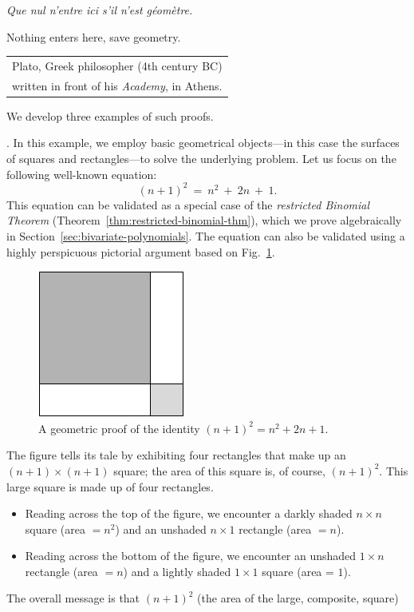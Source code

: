 \medskip


{\it Que nul n'entre ici s'il n'est g\'eom\`etre.}

Nothing enters here, save geometry.

\hfill {\small \begin{tabular}{l}
Plato, Greek philosopher (4th century BC) \\
written in front of his \textit{Academy}, in Athens. 
\end{tabular} }

\medskip

\noindent
We develop three examples of such proofs.

\medskip

.
In this example, we employ basic geometrical objects---in this case the surfaces of squares and rectangles---to solve the underlying problem.  Let us focus on the following well-known equation:
\begin{equation}
(n+1)^2 \ = \ n^2 \ + \ 2n \ + \ 1.
\end{equation}
This equation can be validated as a special case of the {\em restricted Binomial Theorem}
(Theorem~\ref{thm:restricted-binomial-thm}), which we prove algebraically in Section~\ref{sec:bivariate-polynomials}.  The equation can also be validated using a highly perspicuous pictorial argument based on Fig.~\ref{fig:proofa2plusb2}.
\begin{figure}[ht]
\begin{center}
       \includegraphics[scale=0.4]{FiguresMaths/proofa2plusb2}
\caption{A geometric proof of the identity $(n+1)^2 = n^2 + 2n + 1$.}
       \label{fig:proofa2plusb2}
\end{center}
\end{figure}
The figure tells its tale by exhibiting four rectangles that make up an $(n+1) \times (n+1)$ square; the area of this square is, of course, $(n+1)^2$.  This large square is made up of four rectangles.
\begin{itemize}
\item
Reading across the top of the figure, we encounter a darkly shaded $n \times n$ square (area $= n^2$) and an unshaded $n \times 1$ rectangle (area $= n$).
\item
Reading across the bottom of the figure, we encounter an unshaded $1 \times n$ rectangle (area $= n$) and a lightly shaded $1 \times 1$ square (area = $1$).
\end{itemize}
The overall message is that $(n+1)^2$ (the area of the large, composite, square)

